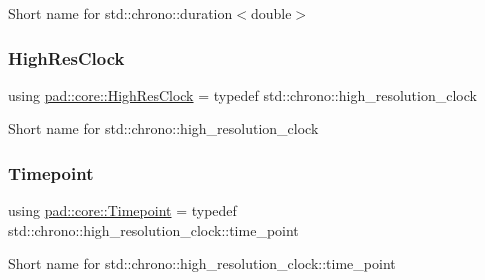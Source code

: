 Short name for std\+::chrono\+::duration$<$double$>$ \mbox{\label{namespacepad_1_1core_a4b3e3b386aa503ef3565538e435d3cf7}} 
\subsubsection{\texorpdfstring{High\+Res\+Clock}{HighResClock}}
{\footnotesize\ttfamily using \mbox{\hyperlink{namespacepad_1_1core_a4b3e3b386aa503ef3565538e435d3cf7}{pad\+::core\+::\+High\+Res\+Clock}} = typedef std\+::chrono\+::high\+\_\+resolution\+\_\+clock}

Short name for std\+::chrono\+::high\+\_\+resolution\+\_\+clock \mbox{\label{namespacepad_1_1core_a4359864da05f393ed6e69d9d018946ad}} 
\subsubsection{\texorpdfstring{Timepoint}{Timepoint}}
{\footnotesize\ttfamily using \mbox{\hyperlink{namespacepad_1_1core_a4359864da05f393ed6e69d9d018946ad}{pad\+::core\+::\+Timepoint}} = typedef std\+::chrono\+::high\+\_\+resolution\+\_\+clock\+::time\+\_\+point}

Short name for std\+::chrono\+::high\+\_\+resolution\+\_\+clock\+::time\+\_\+point 